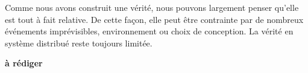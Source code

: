 \documentclass[12pt,a4paper]{article}
\begin{document}
Comme nous avons construit une vérité, nous pouvons largement penser qu'elle est tout à fait relative. De cette façon, elle peut être contrainte par de nombreux événements imprévisibles, environnement ou choix de conception. La vérité en système distribué reste toujours limitée.

\textbf{à rédiger}


\end{document}
